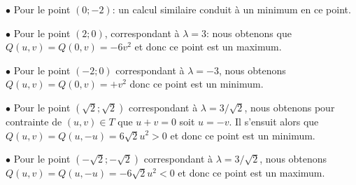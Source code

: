 {{$\bullet$ Pour le point $(0;-2)$: un calcul similaire conduit à un minimum en ce point. 


$\bullet$ Pour le point $(2;0)$, correspondant à $\lambda =3$: nous obtenons que 
$Q(u,v)=Q(0,v)=-6v^2$ et donc ce point est un maximum. 


$\bullet$ Pour le point $(-2;0)$ correspondant à $\lambda =-3$, nous obtenons 
$Q(u,v)=Q(0,v)=+v^2$ donc ce point est un minimum. 


$\bullet$ Pour le point $(\sqrt{2};\sqrt{2})$ correspondant à $\lambda = 3/\sqrt{2}$, nous obtenons pour contrainte de $(u,v)\in T$ que $u+v=0$ soit $u=-v$.
Il s'ensuit alors que $Q(u,v)=Q(u,-u)=6\sqrt{2}u^2>0$ et donc ce point est un minimum.


$\bullet$ Pour le point $(-\sqrt{2};-\sqrt{2})$ correspondant à $\lambda = 3/\sqrt{2}$, nous obtenons 
$Q(u,v)=Q(u,-u)=-6\sqrt{2}u^2<0$ et donc ce point est un maximum. 


}
}